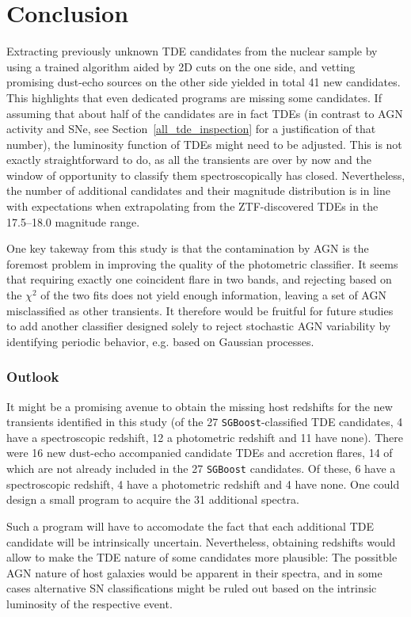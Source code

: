 \section{Conclusion}\label{nuc_conclusion}
Extracting previously unknown TDE candidates from the nuclear sample by using a trained algorithm aided by 2D cuts on the one side, and vetting promising dust-echo sources on the other side yielded in total 41 new candidates. This highlights that even dedicated programs are missing some candidates. If assuming that about half of the candidates are in fact TDEs (in contrast to AGN activity and SNe, see Section~\ref{all_tde_inspection} for a justification of that number), the luminosity function of TDEs might need to be adjusted. This is not exactly straightforward to do, as all the transients are over by now and the window of opportunity to classify them spectroscopically has closed. Nevertheless, the number of additional candidates and their magnitude distribution is in line with expectations when extrapolating from the ZTF-discovered TDEs in the 17.5--18.0 magnitude range.

One key takeway from this study is that the contamination by AGN is the foremost problem in improving the quality of the photometric classifier. It seems that requiring exactly one coincident flare in two bands, and rejecting based on the $\chi^2$ of the two fits does not yield enough information, leaving a set of AGN misclassified as other transients. It therefore would be fruitful for future studies to add another classifier designed solely to reject stochastic AGN variability by identifying periodic behavior, e.g. based on Gaussian processes.

\subsubsection{Outlook}

It might be a promising avenue to obtain the missing host redshifts for the new transients identified in this study (of the 27 \texttt{SGBoost}-classified TDE candidates, 4 have a spectroscopic redshift, 12 a photometric redshift and 11 have none). There were 16 new dust-echo accompanied candidate TDEs and accretion flares, 14 of which are not already included in the 27 \texttt{SGBoost} candidates. Of these, 6 have a spectroscopic redshift, 4 have a photometric redshift and 4 have none. One could design a small program to acquire the 31 additional spectra.

Such a program will have to accomodate the fact that each additional TDE candidate will be intrinsically uncertain. Nevertheless, obtaining redshifts would allow to make the TDE nature of some candidates more plausible: The possitble AGN nature of host galaxies would be apparent in their spectra, and in some cases alternative SN classifications might be ruled out based on the intrinsic luminosity of the respective event.

